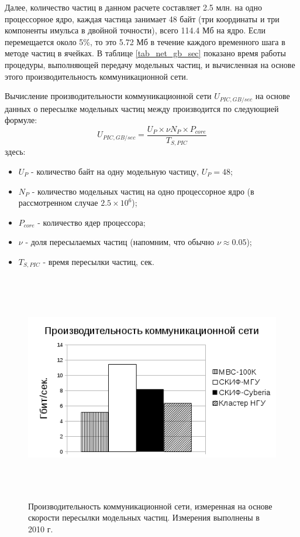 Далее, количество частиц в данном расчете составляет 2.5 млн. на одно процессорное ядро, каждая частица занимает 48 байт (три координаты и три компоненты имульса в двойной точности), всего 114.4 Мб на ядро. Если перемещается около 5\%, то это 5.72 Мб в течение каждого временного шага в методе частиц в ячейках. В таблице \ref{tab_net_gb_sec} показано время работы процедуры, выполняющей передачу модельных частиц, и вычисленная на основе этого производительность коммуникационной сети.


Вычисление производительности коммуникационной сети $U_{PIC,GB/sec}$ на основе данных о пересылке модельных частиц между  производится по следующией формуле:
$$
U_{PIC,GB/sec} = \frac{U_P\times \nu N_P \times P_{core}}{T_{S,PIC}}
$$
здесь:
\begin{itemize}
	\item $U_P$ - количество байт на одну модельную частицу, $U_P = 48$;
	\item $N_P$ - количество модельных частиц на одно процессорное ядро (в рассмотренном случае $2.5\times 10^6$);  
	\item $P_{core}$ - количество ядер процессора;
	\item $\nu$ - доля пересылаемых частиц (напомним, что обычно $\nu \approx 0.05$);
	\item $T_{S,PIC}$  - время пересылки частиц, сек.
\end{itemize}	



\begin{figure}[htb]
	\begin{center}
		\includegraphics[height=10cm,keepaspectratio]{images/PIC_RAM_Gb_sec.png}
	\end{center}
	\caption{Производительность коммуникационной сети, измеренная на основе скорости пересылки модельных частиц. Измерения выполнены в 2010 г.}
	\label{plot_net_gb_sec}
\end{figure} 

